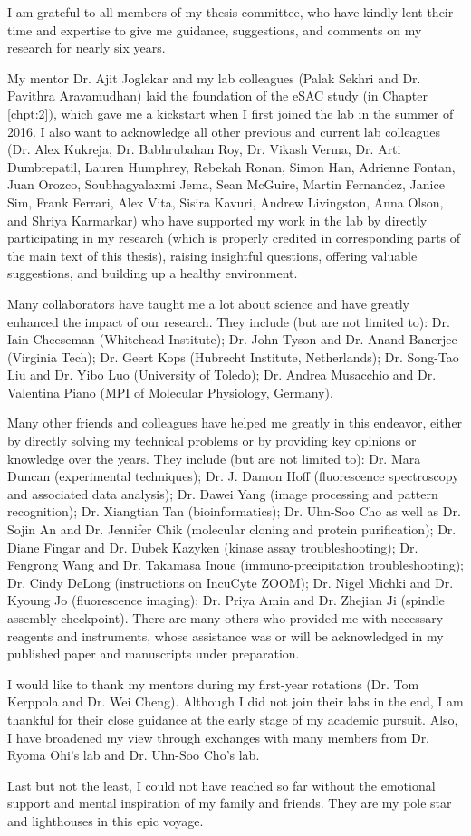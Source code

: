 I am grateful to all members of my thesis committee, who have kindly lent their time and expertise to give me guidance, suggestions, and comments on my research for nearly six years.

My mentor Dr. Ajit Joglekar and my lab colleagues (Palak Sekhri and Dr. Pavithra Aravamudhan) laid the foundation of the eSAC study (in Chapter \ref{chpt:2}), which gave me a kickstart when I first joined the lab in the summer of 2016. I also want to acknowledge all other previous and current lab colleagues (Dr. Alex Kukreja, Dr. Babhrubahan Roy, Dr. Vikash Verma, Dr. Arti Dumbrepatil, Lauren Humphrey, Rebekah Ronan, Simon Han,  Adrienne Fontan, Juan Orozco, Soubhagyalaxmi Jema, Sean McGuire, Martin Fernandez, Janice Sim, Frank Ferrari, Alex Vita, Sisira Kavuri, Andrew Livingston, Anna Olson, and Shriya Karmarkar) who have supported my work in the lab by directly participating in my research (which is properly credited in corresponding parts of the main text of this thesis), raising insightful questions, offering valuable suggestions, and building up a healthy environment.

Many collaborators have taught me a lot about science and have greatly enhanced the impact of our research. They include (but are not limited to): Dr. Iain Cheeseman (Whitehead Institute); Dr. John Tyson and Dr. Anand Banerjee (Virginia Tech); Dr. Geert Kops (Hubrecht Institute, Netherlands); Dr. Song-Tao Liu and Dr. Yibo Luo (University of Toledo); Dr. Andrea Musacchio and Dr. Valentina Piano (MPI of Molecular Physiology, Germany).

Many other friends and colleagues have helped me greatly in this endeavor, either by directly solving my technical problems or by providing key opinions or knowledge over the years. They include (but are not limited to): Dr. Mara Duncan (experimental techniques); Dr. J. Damon Hoff (fluorescence spectroscopy and associated data analysis); Dr. Dawei Yang (image processing and pattern recognition); Dr. Xiangtian Tan (bioinformatics); Dr. Uhn-Soo Cho as well as Dr. Sojin An and Dr. Jennifer Chik (molecular cloning and protein purification); Dr. Diane Fingar and Dr. Dubek Kazyken (kinase assay troubleshooting); Dr. Fengrong Wang and Dr. Takamasa Inoue (immuno-precipitation troubleshooting); Dr. Cindy DeLong (instructions on IncuCyte ZOOM); Dr. Nigel Michki and Dr. Kyoung Jo (fluorescence imaging); Dr. Priya Amin and Dr. Zhejian Ji (spindle assembly checkpoint). There are many others who provided me with necessary reagents and instruments, whose assistance was or will be acknowledged in my published paper \cite{eSAC} and manuscripts under preparation.

I would like to thank my mentors during my first-year rotations (Dr. Tom Kerppola and Dr. Wei Cheng). Although I did not join their labs in the end, I am thankful for their close guidance at the early stage of my academic pursuit. Also, I have broadened my view through exchanges with many members from Dr. Ryoma Ohi's lab and Dr. Uhn-Soo Cho's lab.

Last but not the least, I could not have reached so far without the emotional support and mental inspiration of my family and friends. They are my pole star and lighthouses in this epic voyage.
